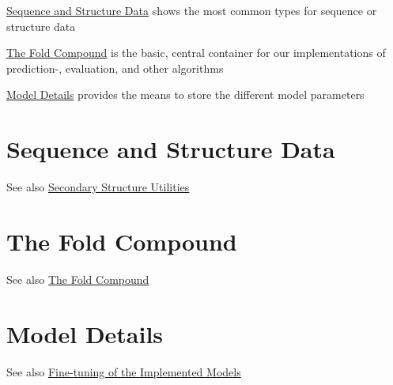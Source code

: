 
\begin{DoxyItemize}
\item \hyperlink{sequence_structure_data}{Sequence and Structure Data} shows the most common types for sequence or structure data
\item \hyperlink{fold_compound_container}{The \textquotesingle{}Fold Compound\textquotesingle{}} is the basic, central container for our implementations of prediction-\/, evaluation, and other algorithms
\item \hyperlink{model_settings}{Model Details} provides the means to store the different model parameters 
\end{DoxyItemize}\hypertarget{sequence_structure_data}{}\section{Sequence and Structure Data}\label{sequence_structure_data}
\begin{DoxySeeAlso}{See also}
\hyperlink{group__struct__utils}{Secondary Structure Utilities} 
\end{DoxySeeAlso}
\hypertarget{fold_compound_container}{}\section{The \textquotesingle{}Fold Compound\textquotesingle{}}\label{fold_compound_container}
\begin{DoxySeeAlso}{See also}
\hyperlink{group__fold__compound}{The Fold Compound} 
\end{DoxySeeAlso}
\hypertarget{model_settings}{}\section{Model Details}\label{model_settings}
\begin{DoxySeeAlso}{See also}
\hyperlink{group__model__details}{Fine-\/tuning of the Implemented Models} 
\end{DoxySeeAlso}
